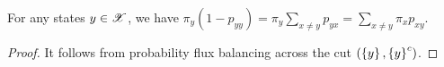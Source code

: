 \documentclass[letterpaper,10pt,english]{article}
\begin{document}
\begin{cor}
For any states $y \in \mathscr{X}$, we have $\pi_y(1-p_{yy}) = \pi_y \sum_{x \neq y}p_{yx} = \sum_{x \neq y}\pi_xp_{xy}$. 
\end{cor}
\begin{proof}
It follows from probability flux balancing across the cut $(\left\{y\right\}, \left\{y\right\}^c)$. 
\end{proof}

\end{document}
